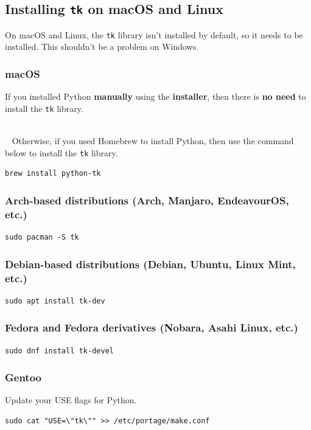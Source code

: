 \documentclass[11pt]{article}
\begin{document}
 \newpage

\subsection{Installing \texttt{tk} on macOS and Linux}
\label{sec:orgd09dc6b}
On macOS and Linux, the \texttt{tk} library isn't installed by default, so it needs to be installed. This shouldn't be a problem on Windows.

\subsubsection{macOS}
\label{sec:org6152015}
If you installed Python \textbf{manually} using the \textbf{installer}, then there is \textbf{no need} to install the \texttt{tk} library.

 ~\\~  Otherwise, if you used Homebrew to install Python, then use the command below to install the \texttt{tk} library.
\begin{verbatim}
brew install python-tk
\end{verbatim}

\subsubsection{Arch-based distributions (Arch, Manjaro, EndeavourOS, etc.)}
\label{sec:org66c42b0}
\begin{verbatim}
sudo pacman -S tk
\end{verbatim}

\subsubsection{Debian-based distributions (Debian, Ubuntu, Linux Mint, etc.)}
\label{sec:org5533e1e}
\begin{verbatim}
sudo apt install tk-dev
\end{verbatim}

\subsubsection{Fedora and Fedora derivatives (Nobara, Asahi Linux, etc.)}
\label{sec:orge0bed26}
\begin{verbatim}
sudo dnf install tk-devel
\end{verbatim}

\subsubsection{Gentoo}
\label{sec:orge8b6577}
Update your USE flags for Python.
\begin{verbatim}
sudo cat "USE=\"tk\"" >> /etc/portage/make.conf
\end{verbatim}
\end{document}
